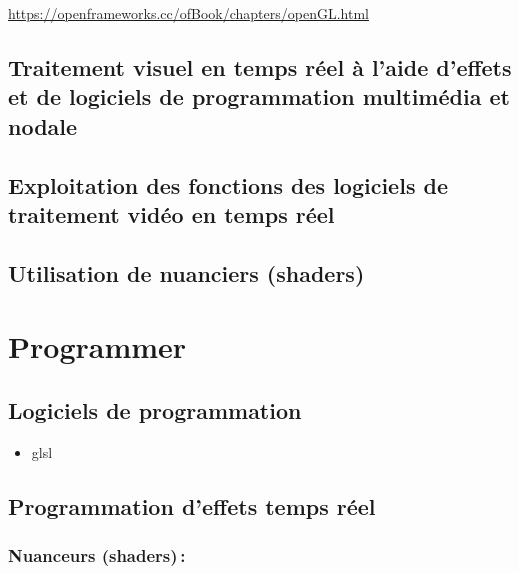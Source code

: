 \documentclass[
]{book}
\providecommand{\tightlist}{%
  \setlength{\itemsep}{0pt}\setlength{\parskip}{0pt}}
\begin{document}
\url{https://openframeworks.cc/ofBook/chapters/openGL.html}

\hypertarget{traitement-visuel-en-temps-ruxe9el-uxe0-laide-deffets-et-de-logiciels-de-programmation-multimuxe9dia-et-nodale}{%
\section{Traitement visuel en temps réel à l'aide d'effets et de logiciels de programmation multimédia et nodale}\label{traitement-visuel-en-temps-ruxe9el-uxe0-laide-deffets-et-de-logiciels-de-programmation-multimuxe9dia-et-nodale}}

\hypertarget{exploitation-des-fonctions-des-logiciels-de-traitement-viduxe9o-en-temps-ruxe9el}{%
\section{Exploitation des fonctions des logiciels de traitement vidéo en temps réel}\label{exploitation-des-fonctions-des-logiciels-de-traitement-viduxe9o-en-temps-ruxe9el}}

\hypertarget{utilisation-de-nuanciers-shaders}{%
\section{Utilisation de nuanciers (shaders)}\label{utilisation-de-nuanciers-shaders}}

\hypertarget{programmer}{%
\chapter{Programmer}\label{programmer}}

\hypertarget{programmer_logiciels}{%
\section{Logiciels de programmation}\label{programmer_logiciels}}

\begin{itemize}
\tightlist
\item
  glsl
\end{itemize}

\hypertarget{programmation-deffets-temps-ruxe9el}{%
\section{Programmation d'effets temps réel}\label{programmation-deffets-temps-ruxe9el}}

\hypertarget{nuanceurs-shaders}{%
\subsection{Nuanceurs (shaders)\,:}\label{nuanceurs-shaders}}
\end{document}
